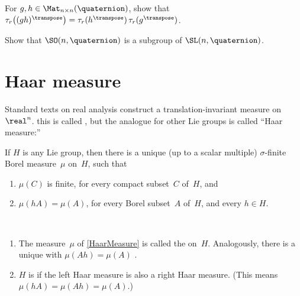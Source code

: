 \begin{exercises}
\item \label{tau(transpose)}
 For $g,h \in \Mat_{n \times n}(\quaternion)$, show that
$\tau_r \bigl( (gh)^\transpose \bigr) = \tau_r(
h^\transpose) \, \tau_r( g^{\transpose})$.

\item Show that $\SO(n,\quaternion)$ is a subgroup of
$\SL(n,\quaternion)$.


\end{exercises}






\section{Haar measure}

Standard texts on real analysis construct a translation-invariant measure on~$\real^n$. this is called , but the analogue for other Lie groups is called ``Haar measure:''

\begin{prop} \label{HaarMeasure}
 If $H$ is any Lie group, then there
is a unique\/ \textup(up to a scalar multiple\textup)
$\sigma$-finite Borel measure~$\mu$ on~$H$, such that
 \begin{enumerate}
 \item \label{HaarMeasure-mu(C)}
 $\mu(C)$ is finite, for every compact subset~$C$
of~$H$, 
and
 \item $\mu(hA) = \mu(A)$, for every Borel subset~$A$ of~$H$,
and every $h \in H$.
 \end{enumerate}
 \end{prop}
 
 \begin{defns} \ 
 \noprelistbreak
 \begin{enumerate}
 \item The measure~$\mu$ of
\cref{HaarMeasure} is called the  on~$H$.
Analogously, there is a unique 
with $\mu(Ah) = \mu(A)$ \csee{RightHaarMeasure}.
 \item $H$ is  if the left Haar measure is also a right Haar measure. (This means $\mu(hA) = \mu(Ah) = \mu(A)$.)
 \end{enumerate}
 \end{defns}

